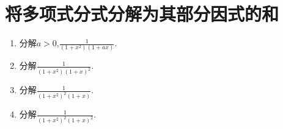 \documentclass[../../main.tex]{subfiles}%
\begin{document}
\section{将多项式分式分解为其部分因式的和}

\begin{example}
\begin{enumerate}
\item 分解\(a > 0\),\(\frac{1}{(1 + x^2)(1 + ax)}\).

\item 分解\(\frac{1}{(1 + x^2)(1 + x)^2}\).

\item 分解\(\frac{1}{(1 + x^2)^2(1 + x)}\).

\item 分解\(\frac{1}{(1 + x^2)^2(1 + x)^2}\).
\end{enumerate}
\end{example}
\end{document}
